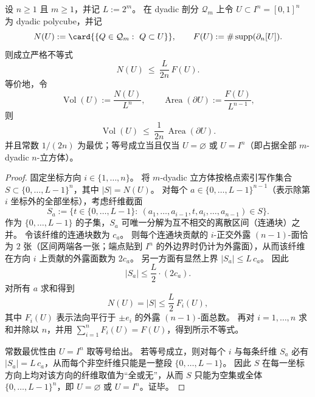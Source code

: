 \begin{theorem}\label{thm:spg-dyadic-polyclube-axial-coarea}
设 \(n\ge 1\) 且 \(m\ge 1\)，并记 \(L:=2^{m}\)。
在 dyadic 剖分 \(\mathcal Q_m\) 上令 \(U\subset I^n=[0,1]^n\) 为 dyadic polycube，并记
\[
N(U):=\card{\{Q\in\mathcal Q_m:\ Q\subset U\}},
\qquad
F(U):=\#\operatorname{supp}(\partial_n[U]).
\]
则成立严格不等式
\[
N(U)\ \le\ \frac{L}{2n}\,F(U).
\]
等价地，令
\[
\operatorname{Vol}(U):=\frac{N(U)}{L^{n}},
\qquad
\operatorname{Area}(\partial U):=\frac{F(U)}{L^{n-1}},
\]
则
\[
\operatorname{Vol}(U)\ \le\ \frac{1}{2n}\,\operatorname{Area}(\partial U).
\]
并且常数 \(1/(2n)\) 为最优；等号成立当且仅当 \(U=\varnothing\) 或 \(U=I^n\)（即占据全部 \(m\)-dyadic \(n\)-立方体）。
\end{theorem}
\begin{proof}
固定坐标方向 \(i\in\{1,\dots,n\}\)。
将 \(m\)-dyadic 立方体按格点索引写作集合 \(S\subset\{0,\dots,L-1\}^n\)，其中 \(|S|=N(U)\)。
对每个 \(a\in\{0,\dots,L-1\}^{n-1}\)（表示除第 \(i\) 坐标外的全部坐标），考虑纤维截面
\[
S_{a}:=\{t\in\{0,\dots,L-1\}:\ (a_1,\dots,a_{i-1},t,a_i,\dots,a_{n-1})\in S\}.
\]
作为 \(\{0,\dots,L-1\}\) 的子集，\(S_a\) 可唯一分解为互不相交的离散区间（连通块）之并。
令该纤维的连通块数为 \(c_a\)。
则每个连通块贡献的 \(i\)-正交外露 \((n-1)\)-面恰为 \(2\) 张（区间两端各一张；端点贴到 \(I^n\) 的外边界时仍计为外露面），从而该纤维在方向 \(i\) 上贡献的外露面数为 \(2c_a\)。
另一方面有显然上界 \(|S_a|\le L\,c_a\)。
因此
\[
|S_a|\le \frac{L}{2}\cdot (2c_a).
\]
对所有 \(a\) 求和得到
\[
N(U)=|S|\le \frac{L}{2}\,F_i(U),
\]
其中 \(F_i(U)\) 表示法向平行于 \(\pm e_i\) 的外露 \((n-1)\)-面总数。
再对 \(i=1,\dots,n\) 求和并除以 \(n\)，并用 \(\sum_{i=1}^n F_i(U)=F(U)\)，得到所示不等式。
\par
常数最优性由 \(U=I^n\) 取等号给出。
若等号成立，则对每个 \(i\) 与每条纤维 \(S_a\) 必有 \(|S_a|=L\,c_a\)，从而每个非空纤维只能是一整段 \(\{0,\dots,L-1\}\)。
因此 \(S\) 在每一坐标方向上均对该方向的纤维取值为“全或无”，从而 \(S\) 只能为空集或全体 \(\{0,\dots,L-1\}^n\)，即 \(U=\varnothing\) 或 \(U=I^n\)。证毕。
\end{proof}

